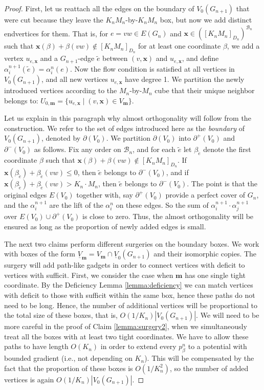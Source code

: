 \documentclass[10pt]{article}
\theoremstyle{plain}
\theoremstyle{remark}
\newcommand{\1}{\mathbbm{1}}
\numberwithin{equation}{section}
\begin{document}
\begin{proof}

First, let us reattach all the edges on the boundary of $V_0(G_{n+1})$ that were cut because they leave the $K_n M_n$-by-$K_nM_n$ box, but now we add distinct endvertices for them. That is, for $e=vw \in E(G_n)$ and $\mathbf{x} \in ([K_n M_n]_{D_n})^{\mathcal{B}_n}$ such that $\mathbf{x}(\beta) + \beta(vw) \notin [K_n M_n]_{D_n}$ for at least one coordinate $\beta$, we add a vertex $u_{e,\mathbf{x}}$ and a $G_{n+1}$-edge $\tilde{e}$ between $(v,\mathbf{x})$ and $u_{e,\mathbf{x}}$, and define $\alpha^{n+1}_i(\tilde{e}) = \alpha^n_i(e)$. Now the flow condition is satisfied at all vertices in $V_0(G_{n+1})$, and all new vertices $u_{e,\mathbf{x}}$ have degree 1. We partition the newly introduced vertices according to the $M_n$-by-$M_n$ cube that their unique neighbor belongs to: $U_{0,\mathbf{m}}=\{u_{e,\mathbf{x}} \mid (v,\mathbf{x}) \in V_{\mathbf{m}}\}$.

Let us explain in this paragraph why almost orthogonality will follow from the construction.
We refer to the set of edges introduced here as the \emph{boundary} of $V_0(G_{n+1})$, denoted by $\partial(V_0)$. We partition $\partial(V_0)$ into $\partial^{+}(V_0)$ and $\partial^{-}(V_0)$ as follows. Fix any order on $\mathcal{B}_n$, and for each $\tilde{e}$ let $\beta_{\tilde{e}}$ denote the first coordinate $\beta$ such that $\mathbf{x}(\beta) + \beta(vw) \notin [K_n M_n]_{D_n}$. If $\mathbf{x}(\beta_{\tilde{e}}) + \beta_{\tilde{e}}(vw) \leq 0$, then $\tilde{e}$ belongs to $\partial^{-}(V_0)$, and if $\mathbf{x}(\beta_{\tilde{e}}) + \beta_{\tilde{e}}(vw) > K_n \cdot M_n$, then $\tilde{e}$ belongs to $\partial^{-}(V_0)$. The point is that the original edges $E(V_0)$ together with, say $\partial^{+}(V_0)$ provide a perfect cover of $G_n$, and the $\alpha^{n+1}_i$ are the lift of the $\alpha^{n}_i$ on these edges. So the sum of $\alpha^{n+1}_i\cdot \alpha^{n+1}_j$ over $E(V_0)\cup\partial^{+}(V_0)$ is close to zero. Thus, the almost orthogonality will be ensured as long as the proportion of newly added edges is small. 

The next two claims perform different surgeries on the boundary boxes. We work with boxes of the form $\underline{V}_{\mathbf{m}}=V_{\mathbf{m}} \cap \underline{V}_0({G_{n+1}})$ and their isomorphic copies. The surgery will add path-like gadgets in order to connect vertices with deficit to vertices with sufficit. First, we consider the case when $\mathbf{m}$ has one single tight coordinate. By the Deficiency Lemma \ref{lemma:deficiency} we can match vertices with deficit to those with sufficit within the same box, hence these paths do not need to be long. Hence, the number of additional vertices will be proportional to the total size of these boxes, that is, $O(1/K_n)|V_0(G_{n+1})|$. We will need to be more careful in the proof of Claim \ref{lemma:surgery2}, when we simultaneously treat all the boxes with at least two tight coordinates. We have to allow these paths to have length $O(K_n)$ in order to extend every $p_{\beta}^n$ to a potential with bounded gradient (i.e., not depending on $K_n$). This will be compensated by the fact that the proportion of these boxes is $O(1/K_n^2)$, so the number of added vertices is again $O(1/K_n)|V_0(G_{n+1})|$.


\end{proof}
\end{document}
